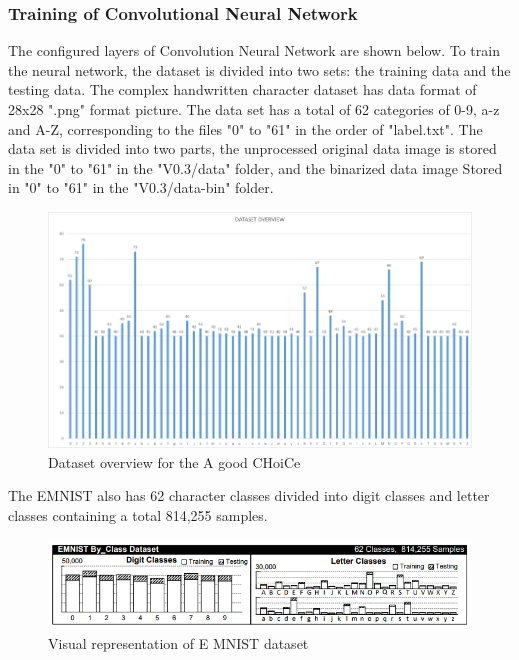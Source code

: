 \subsubsection{Training of Convolutional Neural Network}
The configured layers of Convolution Neural Network are shown below. To train the neural network, the dataset is divided into two sets: the training data and the testing data. The complex handwritten character dataset has data format of 28x28 ".png" format picture. The data set has a total of 62 categories of 0-9, a-z and A-Z, corresponding to the files "0" to "61" in the order of "label.txt". The data set is divided into two parts, the unprocessed original data image is stored in the "0" to "61" in the "V0.3/data" folder, and the binarized data image Stored in "0" to "61" in the "V0.3/data-bin" folder\cite{Ishfar2020DocumentDetection}.
\begin{figure}[h]
    \centering
        \includegraphics[scale=0.45]{images/Data_overview.png}
        \caption{Dataset overview for the A good CHoiCe}%
    \end{figure}
    The EMNIST also has 62 character classes divided into digit classes and letter classes containing a total 814,255 samples\cite{Ishfar2020DocumentDetection}.
    \begin{figure}[h]

        \centering
            \includegraphics[scale=0.45]{images/EMNIST_Dataset.png}
            \caption{Visual representation of E MNIST dataset}%
        \end{figure}  
